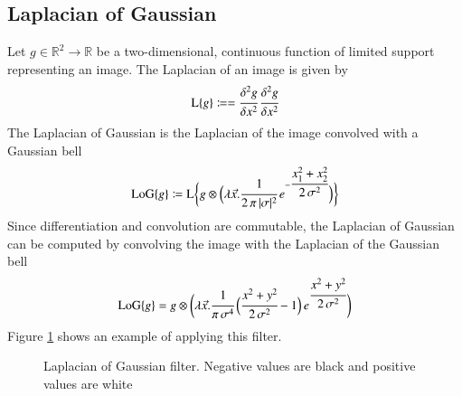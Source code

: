 \documentclass[a4paper,12pt]{book}
\begin{document}
\subsection{Laplacian of Gaussian}
Let $g\in\mathbb{R}^2\to\mathbb{R}$ be a two-dimensional, continuous function
of limited support representing an image. The Laplacian of an image is given
by\cite{log}
\begin{equation*}
  \mathrm{L}\{g\}\coloneqq=\cfrac{\delta^2g}{\delta x^2}\,
  \cfrac{\delta^2g}{\delta x^2}
\end{equation*}
The Laplacian of Gaussian is the Laplacian of the image convolved with a
Gaussian bell
\begin{equation*}
  \mathrm{LoG}\{g\}\coloneqq\mathrm{L}\bigg\{g\otimes
  \Big(\lambda\vec{x}.\cfrac{1}{2\,\pi\,|\sigma|^2}\,
  e^{-\cfrac{x_1^2+x_2^2}{2\,\sigma^2}}\Big)\bigg\}
\end{equation*}
Since differentiation and convolution are commutable, the Laplacian of
Gaussian can be computed by convolving the image with the Laplacian of
the Gaussian bell\cite{log}
\begin{equation*} %
  \mathrm{LoG}\{g\}=
  g\otimes\bigg(\lambda\vec{x}.\cfrac{1}{\pi\,\sigma^4}\,
  \Big(\cfrac{x^2+y^2}{2\,\sigma^2}-1\Big)\,
  e^{\cfrac{x^2+y^2}{2\,\sigma^2}}\bigg)
\end{equation*}
Figure \ref{fig:log} shows an example of applying this filter.
\begin{figure}[htbp]
   \begin{center}
     \begin{minipage}[c]{.45\textwidth}
     \end{minipage}
     \begin{minipage}[c]{.45\textwidth}
     \end{minipage}
     \caption{Laplacian of Gaussian filter. Negative values
       are black and positive values are white\label{fig:log}}
   \end{center} %
\end{figure}
\end{document}
